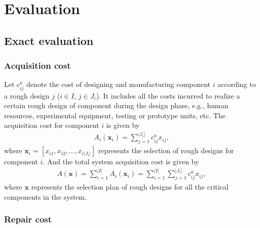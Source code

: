 \documentclass[preprint,12pt]{elsarticle}
\begin{document}
\section{Evaluation}
\subsection{Exact evaluation}

\subsubsection{Acquisition cost}
	
	Let $c_{ij}^{a}$ denote the cost of designing and manufacturing component $i$ according to a rough design $j$ ($i \in I$, $j \in J_{i}$). It includes all the costs incurred to realize a certain rough design of component during the design phase, e.g., human resources, experimental equipment, testing or prototype units, etc. The acquisition cost for component $i$ is given by
\small
\begin{eqnarray}
A_{i}(\boldsymbol{x}_{i})=\sum^{\lvert J_{i} \rvert}_{j=1} {c_{ij}^{a} x_{ij}},
\label{Ai}
\end{eqnarray}
\normalsize
where $\boldsymbol{x}_{i}=[x_{i1},x_{i2},...,x_{i\lvert J_{i}\rvert}]$ represents the selection of rough designs for component $i$.
And the total system acquisition cost is given by
\small
\begin{eqnarray}
A(\boldsymbol{x})=\sum ^{\lvert I \rvert}_{i=1}A_{i}(\boldsymbol{x}_{i})=\sum ^{\lvert I \rvert}_{i=1}\sum^{\lvert J_{i} \rvert}_{j=1} {c_{ij}^{a} x_{ij}}, \label{A}
\end{eqnarray}
\normalsize
where $\boldsymbol{x}$ represents the selection plan of rough designs for all the critical components in the system.
	
\subsubsection{Repair cost}
	
\end{document}
